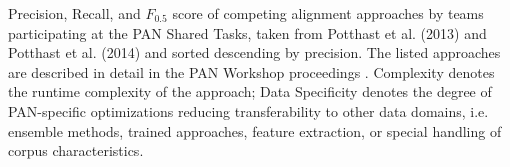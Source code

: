 \begin{table}[th]

\setlength{\tabcolsep}{4pt}%
\caption{Precision, Recall, and $F_{0.5}$ score of competing alignment approaches by teams participating at the PAN Shared Tasks, taken from Potthast et al. (2013)\cite{potthast:2013} and Potthast et al. (2014)\cite{potthast:2014} and sorted descending by precision. The listed approaches are described in detail in the PAN Workshop proceedings \cite{pan:2012,pan:2013,pan:2014}. Complexity denotes the runtime complexity of the approach; Data Specificity denotes the degree of PAN-specific optimizations reducing transferability to other data domains, i.e. ensemble methods, trained approaches, feature extraction, or special handling of corpus characteristics.}
\label{tab:pan13}


\end{table}
